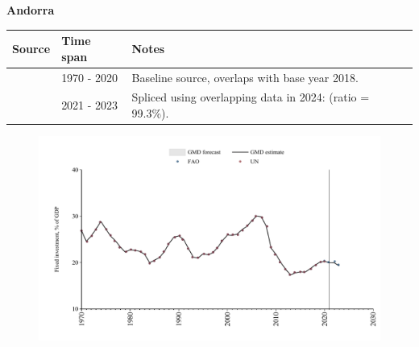 \documentclass[12pt,a4paper,landscape]{article}
\begin{document}
\begin{adjustbox}{max totalsize={\paperwidth}{\paperheight},center}
\begin{minipage}[t][\textheight][t]{\textwidth}
\vspace*{0.5cm}
{}
\begin{center}
{\Large\bfseries Andorra}
\end{center}
\vspace{0.5cm}
\begin{table}[H]
\centering
\small
\begin{tabular}{|l|l|l|}
\hline
\textbf{Source} & \textbf{Time span} & \textbf{Notes} \\
\hline
\rowcolor{white}\cite{UN}& 1970 - 2020 &Baseline source, overlaps with base year 2018.\\
\rowcolor{lightgray}\cite{FAO}& 2021 - 2023 &Spliced using overlapping data in 2024: (ratio = 99.3\%).\\
\hline
\end{tabular}
\end{table}
\begin{figure}[H]
\centering
\includegraphics[width=\textwidth,height=0.6\textheight,keepaspectratio]{graphs/AND_finv_GDP.pdf}
\end{figure}
\end{minipage}
\end{adjustbox}
\end{document}
